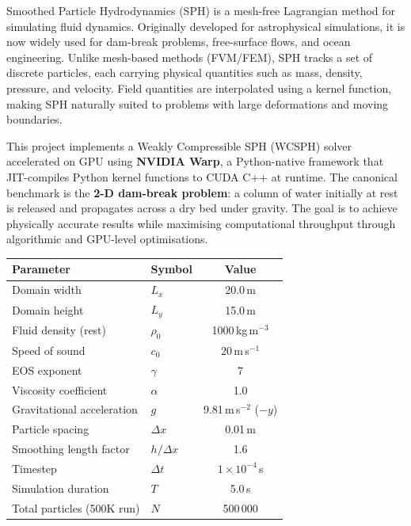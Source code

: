 \documentclass[11pt,a4paper]{article}
\begin{document}
Smoothed Particle Hydrodynamics (SPH) is a mesh-free Lagrangian method for simulating fluid
dynamics. Originally developed for astrophysical simulations, it is now widely used for
dam-break problems, free-surface flows, and ocean engineering. Unlike mesh-based methods
(FVM/FEM), SPH tracks a set of discrete particles, each carrying physical quantities such as
mass, density, pressure, and velocity. Field quantities are interpolated using a kernel function,
making SPH naturally suited to problems with large deformations and moving boundaries.

This project implements a Weakly Compressible SPH (WCSPH) solver accelerated on GPU using
\textbf{NVIDIA Warp}, a Python-native framework that JIT-compiles Python kernel functions to
CUDA C++ at runtime. The canonical benchmark is the \textbf{2-D dam-break problem}: a column
of water initially at rest is released and propagates across a dry bed under gravity. The goal
is to achieve physically accurate results while maximising computational throughput through
algorithmic and GPU-level optimisations.

\vspace{6pt}
\begin{center}
\begin{tabular}{llc}
  \toprule
  \textbf{Parameter} & \textbf{Symbol} & \textbf{Value} \\
  \midrule
  Domain width              & $L_x$        & 20.0\,m \\
  Domain height             & $L_y$        & 15.0\,m \\
  Fluid density (rest)      & $\rho_0$     & 1000\,kg\,m$^{-3}$ \\
  Speed of sound            & $c_0$        & 20\,m\,s$^{-1}$ \\
  EOS exponent              & $\gamma$     & 7 \\
  Viscosity coefficient     & $\alpha$     & 1.0 \\
  Gravitational acceleration& $g$          & 9.81\,m\,s$^{-2}$ ($-y$) \\
  Particle spacing          & $\Delta x$   & 0.01\,m \\
  Smoothing length factor   & $h/\Delta x$ & 1.6 \\
  Timestep                  & $\Delta t$   & $1\times10^{-4}$\,s \\
  Simulation duration       & $T$          & 5.0\,s \\
  Total particles (500K run)& $N$          & 500\,000 \\
  \bottomrule
\end{tabular}
\end{center}
\end{document}
